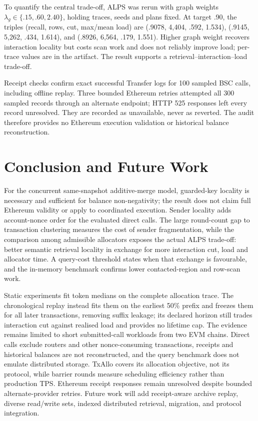 \documentclass[runningheads]{llncs}
\begin{document}
To quantify the central trade-off, ALPS was rerun with graph weights
$\lambda_g\in\{.15,.60,2.40\}$, holding traces, seeds and plans fixed. At
target .90, the triples (recall, rows, cut, max/mean load) are
(.9078, 4,404, .592, 1.534), (.9145, 5,262, .434, 1.614), and
(.8926, 6,564, .179, 1.551). Higher graph weight recovers interaction locality
but costs scan work and does not reliably improve load; per-trace values are in
the artifact. The result supports a retrieval--interaction--load trade-off.

Receipt checks confirm exact successful Transfer logs for 100 sampled BSC calls,
including offline replay. Three bounded Ethereum retries attempted all 300
sampled records through an alternate endpoint; HTTP 525 responses left every
record unresolved. They are recorded as unavailable, never as reverted. The
audit therefore provides no Ethereum execution validation or historical balance
reconstruction.

\section{Conclusion and Future Work}
For the concurrent same-snapshot additive-merge model, guarded-key locality is
necessary and sufficient for balance non-negativity; the result does not claim
full Ethereum validity or apply to coordinated execution. Sender locality adds
account-nonce order for the evaluated direct calls. The large round-count gap
to transaction clustering measures the cost of sender fragmentation, while the
comparison among admissible allocators exposes the actual ALPS trade-off:
better semantic retrieval locality in exchange for more interaction cut, load
and allocator time. A query-cost threshold states when that exchange is favourable,
and the in-memory benchmark confirms lower contacted-region and row-scan work.

Static experiments fit token medians on the complete allocation trace. The
chronological replay instead fits them on the earliest 50\% prefix and freezes
them for all later transactions, removing suffix leakage; its declared horizon
still trades interaction cut against realised load and provides no lifetime cap.
The evidence remains limited to short submitted-call workloads from two EVM
chains. Direct calls exclude routers and other nonce-consuming transactions,
receipts and historical balances are not reconstructed, and the query benchmark
does not emulate distributed storage. TxAllo covers its allocation objective,
not its protocol, while barrier rounds measure scheduling efficiency rather than
production TPS. Ethereum receipt responses remain unresolved despite bounded
alternate-provider retries. Future work will add receipt-aware archive replay, diverse
read/write sets, indexed distributed retrieval, migration, and protocol integration.



\end{document}

